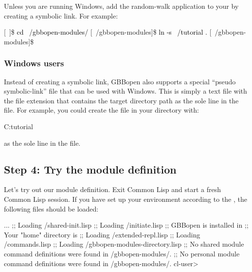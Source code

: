 \documentclass[10pt,twoside,english,pdftex]{article}
\begin{document}
Unless you are running Windows, add the random-walk application to your
 by creating a symbolic link.  For example:
%
\W\supp
\begin{example}
\textcolor{darkergray}{%
  [~]\$ \textcolor{black}{cd ~/gbbopen-modules/}
  [~/gbbopen-modules]\$ \textcolor{black}{ln -s ~/tutorial .}
  [~/gbbopen-modules]\$}
\end{example}

\subsubsection*{Windows users}

Instead of creating a symbolic link, GBBopen also supports a special ``pseudo
symbolic-link'' file that can be used with Windows.  This is simply a text
file with the file extension  that contains the target directory
path as the sole line in the file.  For example, you could create the file
 in your  directory
with:
%
\W\supp
\begin{example}
  C:\bkslash{}tutorial\bkslash
\end{example}
\T\vskip -12pt
%
as the sole line in the file.

\subsection*{Step 4: Try the  module definition}

Let's try out our module definition.  Exit Common Lisp and start a fresh
Common Lisp session.  If you have set up your environment according to the
,
the following files should be loaded:
%
\W\supp
\begin{smallexample}
\textcolor{darkergray}{%
     ...
  ;; Loading /shared-init.lisp
  ;;   Loading /initiate.lisp
  ;; GBBopen is installed in 
  ;; Your "home" directory is 
  ;;     Loading /extended-repl.lisp
  ;;     Loading /commands.lisp
  ;;     Loading /gbbopen-modules-directory.lisp
  ;; No shared module command definitions were found in /gbbopen-modules/.
  ;; No personal module command definitions were found in /gbbopen-modules/.
 cl-user>}
\end{smallexample}
\end{document}
